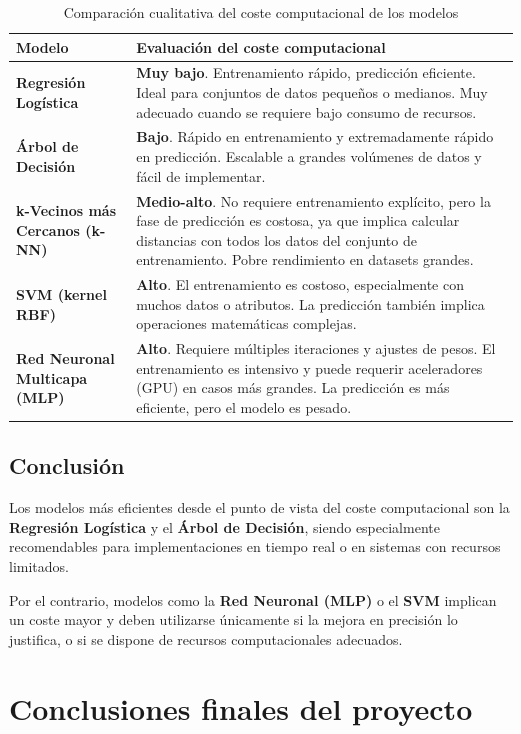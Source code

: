 \documentclass[11pt,a4paper]{article}
\begin{document}
\begin{table}[H]
\centering
\small
\begin{tabular}{lp{10cm}}
\toprule
\textbf{Modelo} & \textbf{Evaluación del coste computacional} \\
\midrule
\textbf{Regresión Logística} & \textbf{Muy bajo}. Entrenamiento rápido, predicción eficiente. Ideal para conjuntos de datos pequeños o medianos. Muy adecuado cuando se requiere bajo consumo de recursos. \\
\textbf{Árbol de Decisión} & \textbf{Bajo}. Rápido en entrenamiento y extremadamente rápido en predicción. Escalable a grandes volúmenes de datos y fácil de implementar. \\
\textbf{k-Vecinos más Cercanos (k-NN)} & \textbf{Medio-alto}. No requiere entrenamiento explícito, pero la fase de predicción es costosa, ya que implica calcular distancias con todos los datos del conjunto de entrenamiento. Pobre rendimiento en datasets grandes. \\
\textbf{SVM (kernel RBF)} & \textbf{Alto}. El entrenamiento es costoso, especialmente con muchos datos o atributos. La predicción también implica operaciones matemáticas complejas. \\
\textbf{Red Neuronal Multicapa (MLP)} & \textbf{Alto}. Requiere múltiples iteraciones y ajustes de pesos. El entrenamiento es intensivo y puede requerir aceleradores (GPU) en casos más grandes. La predicción es más eficiente, pero el modelo es pesado. \\
\bottomrule
\end{tabular}
\caption*{Comparación cualitativa del coste computacional de los modelos}
\end{table}

\subsection*{Conclusión}

Los modelos más eficientes desde el punto de vista del coste computacional son la \textbf{Regresión Logística} y el \textbf{Árbol de Decisión}, siendo especialmente recomendables para implementaciones en tiempo real o en sistemas con recursos limitados.

Por el contrario, modelos como la \textbf{Red Neuronal (MLP)} o el \textbf{SVM} implican un coste mayor y deben utilizarse únicamente si la mejora en precisión lo justifica, o si se dispone de recursos computacionales adecuados.

\section{Conclusiones finales del proyecto}
\end{document}
